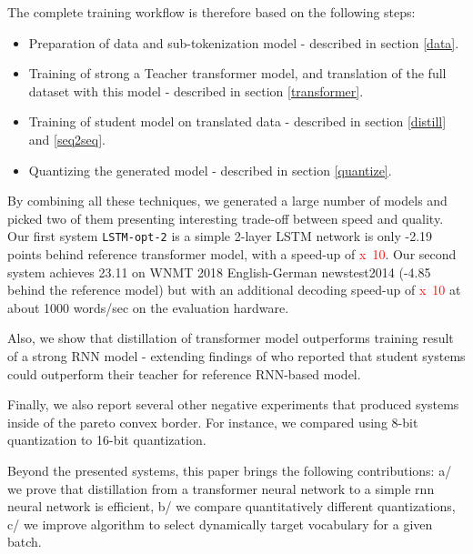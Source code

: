 \documentclass[11pt,a4paper]{article}
\begin{document}
The complete training workflow is therefore based on the following steps:
\begin{itemize}
\item Preparation of data and sub-tokenization model - described in section \ref{data}.
\item Training of strong a Teacher transformer model, and translation of the full dataset with this model - described in section \ref{transformer}.
\item Training of student model on translated data - described in section \ref{distill} and \ref{seq2seq}.
\item Quantizing the generated model - described in section \ref{quantize}.
\end{itemize}

By combining all these techniques, we generated a large number of models and picked two of them presenting interesting trade-off between speed and quality. Our first system {\tt LSTM-opt-2} is a simple 2-layer LSTM network is only -2.19 points behind reference transformer model, with a speed-up of \textcolor{red}{x~10}. Our second system achieves 23.11 on WNMT 2018 English-German newstest2014 (-4.85 behind the reference model) but  with an additional decoding speed-up of \textcolor{red}{x~10} at about 1000 words/sec on the evaluation hardware.

Also, we show that distillation of transformer model outperforms training result of a strong RNN model - extending findings of \cite{DBLP:journals/corr/CregoS16} who reported that student systems could outperform their teacher for reference RNN-based model.

Finally, we also report several other negative experiments that produced systems inside of the pareto convex border. For instance, we compared using 8-bit quantization to 16-bit quantization.

Beyond the presented systems, this paper brings the following contributions: a/ we prove that distillation from a transformer neural network to a simple rnn neural network is efficient, b/ we compare quantitatively different quantizations, c/ we improve algorithm to select dynamically target vocabulary for a given batch.
\end{document}
